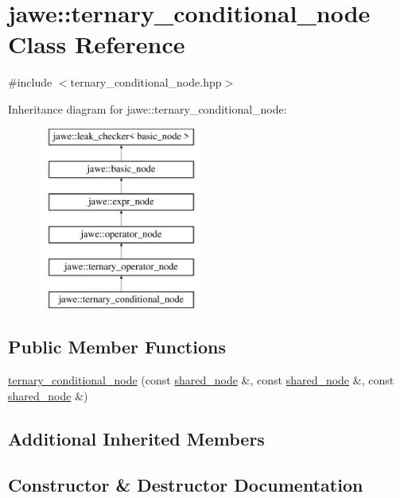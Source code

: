 \hypertarget{classjawe_1_1ternary__conditional__node}{}\section{jawe\+:\+:ternary\+\_\+conditional\+\_\+node Class Reference}
\label{classjawe_1_1ternary__conditional__node}


{\ttfamily \#include $<$ternary\+\_\+conditional\+\_\+node.\+hpp$>$}

Inheritance diagram for jawe\+:\+:ternary\+\_\+conditional\+\_\+node\+:\begin{figure}[H]
\begin{center}
\leavevmode
\includegraphics[height=6.000000cm]{classjawe_1_1ternary__conditional__node}
\end{center}
\end{figure}
\subsection*{Public Member Functions}
\begin{DoxyCompactItemize}
\item 
\hyperlink{classjawe_1_1ternary__conditional__node_a9fcd1325f46b023e884eec7a9cdbfda8}{ternary\+\_\+conditional\+\_\+node} (const \hyperlink{namespacejawe_a3f307481d921b6cbb50cc8511fc2b544}{shared\+\_\+node} \&, const \hyperlink{namespacejawe_a3f307481d921b6cbb50cc8511fc2b544}{shared\+\_\+node} \&, const \hyperlink{namespacejawe_a3f307481d921b6cbb50cc8511fc2b544}{shared\+\_\+node} \&)
\end{DoxyCompactItemize}
\subsection*{Additional Inherited Members}


\subsection{Constructor \& Destructor Documentation}
\mbox{\label{classjawe_1_1ternary__conditional__node_a9fcd1325f46b023e884eec7a9cdbfda8}} 
